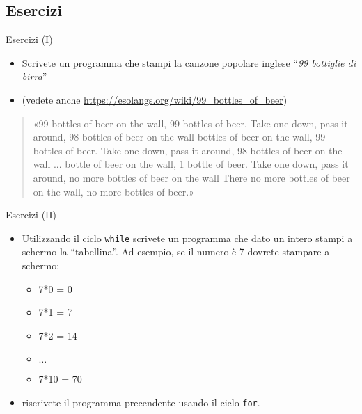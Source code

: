 \subsection[Esercizi]{Esercizi}

\begin{frame}{Esercizi (I)}
  \begin{itemize}
   \item Scrivete un programma che stampi la canzone popolare inglese ``\emph{99 bottiglie di birra}''
   \item (vedete anche \url{https://esolangs.org/wiki/99_bottles_of_beer})
  \end{itemize}
  \begin{quote}
   «99 bottles of beer on the wall, 99 bottles of beer.\newline
   Take one down, pass it around, 98 bottles of beer on the wall  bottles of beer on the wall, 99 bottles of beer.\newline
   Take one down, pass it around, 98 bottles of beer on the wall  \newline
   ... bottle of beer on the wall, 1 bottle of beer.\newline
   Take one down, pass it around, no more bottles of beer on the wall\newline
   There no more bottles of beer on the wall, no more bottles of beer.»
  \end{quote}

\end{frame}

\begin{frame}{Esercizi (II)}
  \begin{itemize}
    \item Utilizzando il ciclo \texttt{while} scrivete un programma che dato un 
    intero stampi a schermo la ``tabellina''.
    Ad esempio, se il numero è 7 dovrete stampare a schermo:
    \begin{itemize}
      \item 7*0 = 0
      \item 7*1 = 7
      \item 7*2 = 14
      \item $\dots$
      \item 7*10 = 70
    \end{itemize}
    \item riscrivete il programma precendente usando il ciclo \texttt{for}.
  \end{itemize}
\end{frame}



